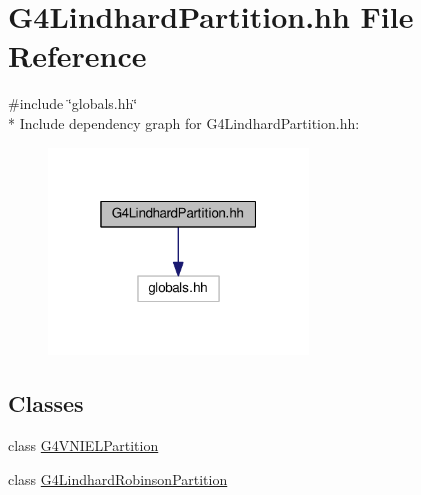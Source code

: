 \hypertarget{G4LindhardPartition_8hh}{}\section{G4\+Lindhard\+Partition.\+hh File Reference}
\label{G4LindhardPartition_8hh}
{\ttfamily \#include \char`\"{}globals.\+hh\char`\"{}}\\*
Include dependency graph for G4\+Lindhard\+Partition.\+hh\+:
\nopagebreak
\begin{figure}[H]
\begin{center}
\leavevmode
\includegraphics[width=196pt]{G4LindhardPartition_8hh__incl}
\end{center}
\end{figure}
\subsection*{Classes}
\begin{DoxyCompactItemize}
\item 
class \hyperlink{classG4VNIELPartition}{G4\+V\+N\+I\+E\+L\+Partition}
\item 
class \hyperlink{classG4LindhardRobinsonPartition}{G4\+Lindhard\+Robinson\+Partition}
\end{DoxyCompactItemize}
